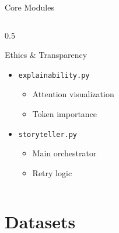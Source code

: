 \documentclass[aspectratio=169]{beamer}
\begin{document}
\begin{frame}{Core Modules}
\begin{columns}
\begin{column}{0.5\textwidth}
\begin{block}{Ethics \& Transparency}
\begin{itemize}
                    \item \texttt{explainability.py}
                    \begin{itemize}
                        \small
                        \item Attention visualization
                        \item Token importance
                    \end{itemize}
                    
                    \item \texttt{storyteller.py}
                    \begin{itemize}
                        \small
                        \item Main orchestrator
                        \item Retry logic
                    \end{itemize}
                \end{itemize}
            \end{block}
        \end{column}
    \end{columns}
\end{frame}

\section{Datasets}
\end{document}
